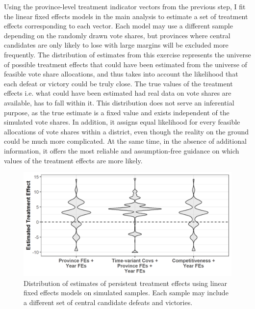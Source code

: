 \documentclass[12pt]{article}
\newcommand{\1}{\mathbbm{1}}
\begin{document}
Using the province-level treatment indicator vectors from the previous step, I fit the linear fixed effects models in the main analysis to estimate a set of treatment effects corresponding to each vector. Each model may use a different sample depending on the randomly drawn vote shares, but provinces where central candidates are only likely to lose with large margins will be excluded more frequently. The distribution of estimates from this exercise represents the universe of possible treatment effects that could have been estimated from the universe of feasible vote share allocations, and thus takes into account the likelihood that each defeat or victory could be truly close. The true values of the treatment effects i.e. what could have been estimated had real data on vote shares are available, has to fall within it. This distribution does not serve an inferential purpose, as the true estimate is a fixed value and exists independent of the simulated vote shares. In addition, it assigns equal likelihood for every feasible allocations of vote shares within a district, even though the reality on the ground could be much more complicated. At the same time, in the absence of additional information, it offers the most reliable and assumption-free guidance on which values of the treatment effects are more likely.

\begin{figure}[!htbp]
	\centering
	\includegraphics[width=.75\textwidth]{figure/200423_impute_results_2011.png}
	\captionsetup{singlelinecheck=off}
	\caption[Estimated linear fixed effects treatment effects using simulated vote shares]{Distribution of estimates of persistent treatment effects using linear fixed effects models on simulated samples. Each sample may include a different set of central candidate defeats and victories.}
	\label{fig:impute_results_2011}
\end{figure}
\end{document}
